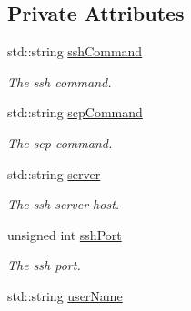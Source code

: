 \subsection*{Private Attributes}
\begin{DoxyCompactItemize}
\item 
\hypertarget{classSSHExec_a4bceea8b974f6d0315f09522bebe119a}{
std::string \hyperlink{classSSHExec_a4bceea8b974f6d0315f09522bebe119a}{sshCommand}}
\label{classSSHExec_a4bceea8b974f6d0315f09522bebe119a}

\begin{DoxyCompactList}\small\item\em The ssh command. \item\end{DoxyCompactList}\item 
\hypertarget{classSSHExec_adcc31b1f8d6749e54128b15ae75b8fcd}{
std::string \hyperlink{classSSHExec_adcc31b1f8d6749e54128b15ae75b8fcd}{scpCommand}}
\label{classSSHExec_adcc31b1f8d6749e54128b15ae75b8fcd}

\begin{DoxyCompactList}\small\item\em The scp command. \item\end{DoxyCompactList}\item 
\hypertarget{classSSHExec_a33551d1b24c5b4dc3194d54270ce32b3}{
std::string \hyperlink{classSSHExec_a33551d1b24c5b4dc3194d54270ce32b3}{server}}
\label{classSSHExec_a33551d1b24c5b4dc3194d54270ce32b3}

\begin{DoxyCompactList}\small\item\em The ssh server host. \item\end{DoxyCompactList}\item 
\hypertarget{classSSHExec_aa36c6d12d08f87f32af8bfce7b7f50ac}{
unsigned int \hyperlink{classSSHExec_aa36c6d12d08f87f32af8bfce7b7f50ac}{sshPort}}
\label{classSSHExec_aa36c6d12d08f87f32af8bfce7b7f50ac}

\begin{DoxyCompactList}\small\item\em The ssh port. \item\end{DoxyCompactList}\item 
\hypertarget{classSSHExec_a8f409ce4f379cd5fed42eeb92f5d8bb9}{
std::string \hyperlink{classSSHExec_a8f409ce4f379cd5fed42eeb92f5d8bb9}{userName}}
\label{classSSHExec_a8f409ce4f379cd5fed42eeb92f5d8bb9}


\end{DoxyCompactItemize}
